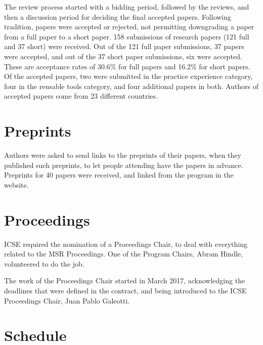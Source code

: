 \documentclass[a4paper]{report}
\begin{document}
The review process started with a bidding period, followed by the reviews, and then a discussion period for deciding the final accepted papers. Following tradition, papers were accepted or rejected, not permitting downgrading a paper from a full paper to a short paper. 158 submissions of research papers (121 full and 37 short) were received. Out of the 121 full paper submissions, 37 papers were accepted, and out of the 37 short paper submissions, six were accepted. These are acceptance rates of 30.6\% for full papers and 16.2\% for short papers. Of the accepted papers, two were submitted in the practice experience category, four in the reusable tools category, and four additional papers in both. Authors of accepted papers come from 23 different countries. 

\section{Preprints}

Authors were asked to send links to the preprints of their papers, when they published such preprints, to let people attending have the papers in advance. Preprints for 40 papers were received, and linked from the program in the website.

\section{Proceedings}

ICSE required the nomination of a Proceedings Chair, to deal with everything related to the MSR Proceedings. One of the Program Chairs, Abram Hindle, volunteered to do the job.

The work of the Proceedings Chair started in March 2017, acknowledging the deadlines that were defined in the contract, and being introduced to the ICSE Proceedings Chair, Juan Pablo Galeotti.



\section{Schedule}
\end{document}
